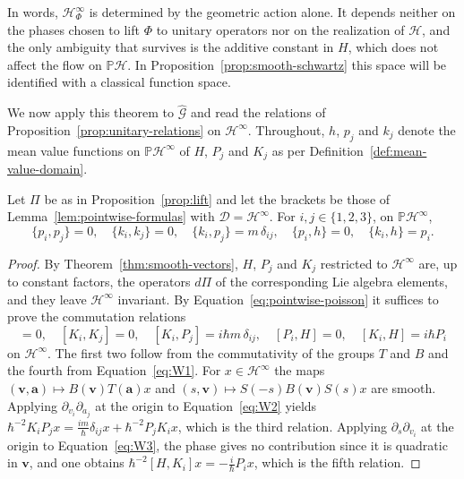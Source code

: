 \noindent In words, $\mathcal{H}^\infty_\Phi$ is determined by the geometric action alone. It depends neither on the phases chosen to lift $\Phi$ to unitary operators nor on the realization of $\mathcal{H}$, and the only ambiguity that survives is the additive constant in $H$, which does not affect the flow on $\mathbb{P}\mathcal{H}$. In Proposition~\ref{prop:smooth-schwartz} this space will be identified with a classical function space.

We now apply this theorem to $\widehat{\mathcal{G}}$ and read the relations of Proposition~\ref{prop:unitary-relations} on $\mathcal{H}^\infty$. Throughout, $h$, $p_j$ and $k_j$ denote the mean value functions on $\mathbb{P}\mathcal{H}^\infty$ of $H$, $P_j$ and $K_j$ as per Definition~\ref{def:mean-value-domain}.

\begin{proposition}\label{prop:galilean-poisson}
	Let $\Pi$ be as in Proposition~\ref{prop:lift} and let the brackets be those of Lemma~\ref{lem:pointwise-formulas} with $\mathcal{D}=\mathcal{H}^\infty$. For $i,j\in\{1,2,3\}$, on $\mathbb{P}\mathcal{H}^\infty$,
	\begin{equation}
		\{p_i,p_j\}=0,\quad \{k_i,k_j\}=0,\quad \{k_i,p_j\}=m\,\delta_{ij},\quad \{p_i,h\}=0,\quad \{k_i,h\}=p_i.
		\label{eq:galilean-poisson}
	\end{equation}
\end{proposition}

\begin{proof}
	By Theorem~\ref{thm:smooth-vectors}, $H$, $P_j$ and $K_j$ restricted to $\mathcal{H}^\infty$ are, up to constant factors, the operators $d\Pi$ of the corresponding Lie algebra elements, and they leave $\mathcal{H}^\infty$ invariant. By Equation~\eqref{eq:pointwise-poisson} it suffices to prove the commutation relations
	\begin{equation}
		[P_i,P_j]=0,\quad [K_i,K_j]=0,\quad [K_i,P_j]=i\hbar m\,\delta_{ij},\quad [P_i,H]=0,\quad [K_i,H]=i\hbar P_i
	\end{equation}
	on $\mathcal{H}^\infty$. The first two follow from the commutativity of the groups $T$ and $B$ and the fourth from Equation~\eqref{eq:W1}. For $x\in\mathcal{H}^\infty$ the maps $(\mathbf{v},\mathbf{a})\mapsto B(\mathbf{v})T(\mathbf{a})x$ and $(s,\mathbf{v})\mapsto S(-s)B(\mathbf{v})S(s)x$ are smooth. Applying $\partial_{v_i}\partial_{a_j}$ at the origin to Equation~\eqref{eq:W2} yields $\hbar^{-2}K_iP_jx=\tfrac{im}{\hbar}\delta_{ij}x+\hbar^{-2}P_jK_ix$, which is the third relation. Applying $\partial_s\partial_{v_i}$ at the origin to Equation~\eqref{eq:W3}, the phase gives no contribution since it is quadratic in $\mathbf{v}$, and one obtains $\hbar^{-2}[H,K_i]x=-\tfrac{i}{\hbar}P_ix$, which is the fifth relation.
\end{proof}

